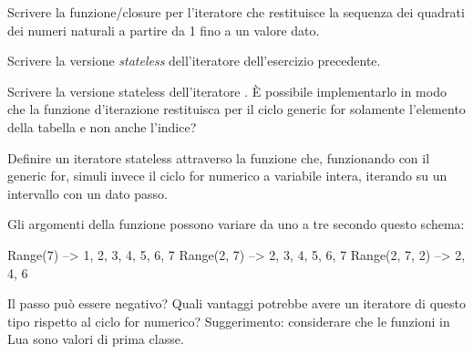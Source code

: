 \begin{Exercise}[label=iter-03]
Scrivere la funzione/closure per l'iteratore che restituisce la sequenza dei
quadrati dei numeri naturali a partire da 1 fino a un valore dato.
\end{Exercise}

\begin{Exercise}[label=iter-04]
Scrivere la versione \emph{stateless} dell'iteratore dell'esercizio precedente.
\end{Exercise}

\begin{Exercise}[label=iter-05]
Scrivere la versione stateless dell'iteratore . È possibile
implementarlo in modo che la funzione d'iterazione restituisca per il ciclo
generic for solamente l'elemento della tabella e non anche l'indice?
\end{Exercise}

\begin{Exercise}[label=iter-06]
Definire un iteratore stateless attraverso la funzione  che,
funzionando con il generic for, simuli invece il ciclo for numerico a variabile
intera, iterando su un intervallo con un dato passo.

Gli argomenti della funzione possono variare da uno a tre secondo questo schema:
\begin{lines}
Range(7)       --> 1, 2, 3, 4, 5, 6, 7
Range(2, 7)    --> 2, 3, 4, 5, 6, 7
Range(2, 7, 2) --> 2, 4, 6
\end{lines}

Il passo può essere negativo? Quali vantaggi potrebbe avere un iteratore di
questo tipo rispetto al ciclo for numerico? Suggerimento: considerare che le
funzioni in Lua sono valori di prima classe.
\end{Exercise}

